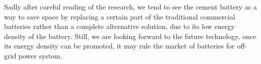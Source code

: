 \documentclass[UTF-8]{article}
\begin{document}
         Sadly after careful reading of the research, we tend to see the cement battery as  a way to save space by replacing a certain part of the traditional commercial batteries rather than a complete alternative solution, due to its low energy density of the battery. Still, we are looking forward to the future technology, once its energy density can be promoted, it may rule the market of batteries for off-grid power system.

    
\end{document}
